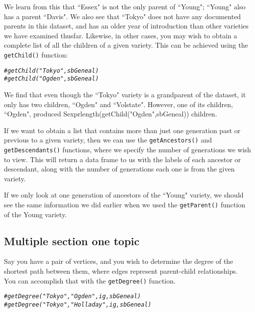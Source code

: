\documentclass{article}\usepackage[]{graphicx}\usepackage[]{color}
\makeatletter
\newcommand{\hlcom}[1]{\textcolor[rgb]{0.678,0.584,0.686}{\textit{#1}}}%
\newenvironment{kframe}{%
 \def\at@end@of@kframe{}%
 \ifinner\ifhmode%
  \def\at@end@of@kframe{\end{minipage}}%
  \begin{minipage}{\columnwidth}%
 \fi\fi%
 \def\FrameCommand##1{\hskip\@totalleftmargin \hskip-\fboxsep
 \colorbox{shadecolor}{##1}\hskip-\fboxsep
     \hskip-\linewidth \hskip-\@totalleftmargin \hskip\columnwidth}%
 \MakeFramed {\advance\hsize-\width
   \@totalleftmargin\z@ \linewidth\hsize
   \@setminipage}}%
 {\par\unskip\endMakeFramed%
 \at@end@of@kframe}
\newenvironment{knitrout}{}{} %
\numberwithin{equation}{section} %
\makeatother
\begin{document}
We learn from this that ``Essex" is not the only parent of ``Young"; ``Young" also has a parent ``Davis". We also see that ``Tokyo" does not have any documented parents in this dataset, and has an older year of introduction than other varieties we have examined thusfar. Likewise, in other cases, you may wish to obtain a complete list of all the children of a given variety. This can be achieved using the \texttt{getChild()} function:

\begin{knitrout}
\color{fgcolor}\begin{kframe}
\begin{alltt}
\hlcom{#getChild("Tokyo",sbGeneal)}
\hlcom{#getChild("Ogden",sbGeneal)}
\end{alltt}
\end{kframe}
\end{knitrout}

We find that even though the ``Tokyo" variety is a grandparent of the dataset, it only has two children, ``Ogden" and ``Volstate". However, one of its children, ``Ogden", produced Sexpr{length(getChild("Ogden",sbGeneal))} children.

If we want to obtain a list that contains more than just one generation past or previous to a given variety, then we can use the \texttt{getAncestors()} and \texttt{getDescendants()} functions, where we specify the number of generations we wish to view. This will return a data frame to us with the labels of each ancestor or descendant, along with the number of generations each one is from the given variety.

If we only look at one generation of ancestors of the ``Young" variety, we should see the same information we did earlier when we used the \texttt{getParent()} function of the Young variety.

\subsection{{Multiple section one topic}}

Say you have a pair of vertices, and you wish to determine the degree of the shortest path between them, where edges represent parent-child relationships. You can accomplish that with the \texttt{getDegree()} function.

\begin{knitrout}
\color{fgcolor}\begin{kframe}
\begin{alltt}
\hlcom{#getDegree("Tokyo", "Ogden", ig, sbGeneal)}
\hlcom{#getDegree("Tokyo", "Holladay", ig, sbGeneal)}
\end{alltt}
\end{kframe}
\end{knitrout}
\end{document}
